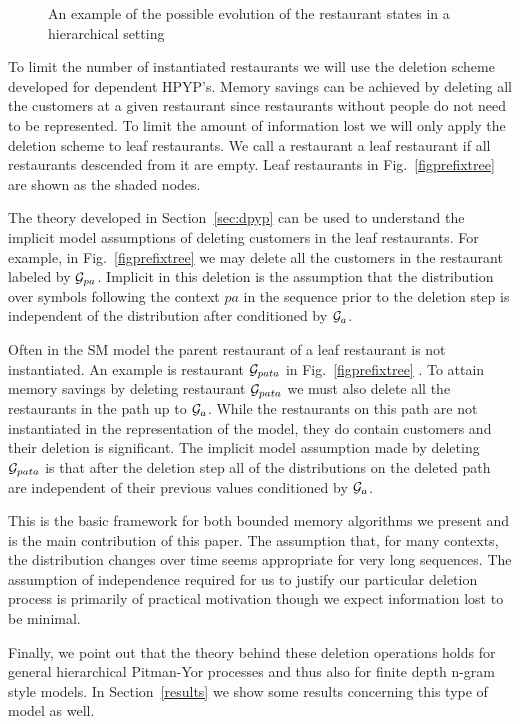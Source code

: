 \begin{figure}[t] 
	\begin{center}
		\caption{An example of the possible evolution of the restaurant states in a hierarchical setting}
		\label{figResultsCC}
	\end{center} 
\end{figure} 

To limit the number of instantiated restaurants we will use the deletion scheme developed for dependent HPYP's. Memory savings can be achieved by deleting all the customers at a given restaurant since restaurants without people do not need to be represented.  To limit the amount of information lost we will only apply the deletion scheme to leaf restaurants. We call a restaurant a leaf restaurant if all restaurants descended from it are empty. Leaf restaurants in Fig.~\ref{figprefixtree} are shown as the shaded nodes. 

The theory developed in Section~\ref{sec:dpyp} can be used to understand the implicit model assumptions of deleting customers in the leaf restaurants. For example, in Fig.~\ref{figprefixtree} we may delete all the customers in the restaurant labeled by $\G_{pa}$.  Implicit in this deletion is the assumption that the distribution over symbols following the context $pa$ in the sequence prior to the deletion step is independent of the distribution after conditioned by $\G_a$.

Often in the SM model the parent restaurant of a leaf restaurant is not instantiated.  An example is restaurant $\G_{pata}$ in Fig.~\ref{figprefixtree}  . To attain memory savings by deleting restaurant $\G_{pata}$ we must also delete all the restaurants in the path up to $\G_a$.  While the restaurants on this path are not instantiated in the representation of the model, they do contain customers and their deletion is significant.  The implicit model assumption made by deleting $\G_{pata}$ is that after the deletion step all of the distributions on the deleted path are independent of their previous values conditioned by $\G_a$.

This is the basic framework for both bounded memory algorithms we present and is the main contribution of this paper.  The assumption that, for many contexts, the distribution changes over time seems appropriate for very long sequences. The assumption of independence required for us to justify our particular deletion process is primarily of practical motivation though we expect information lost to be minimal. 

Finally, we point out that the theory behind these deletion operations holds for general hierarchical Pitman-Yor processes and thus also for finite depth n-gram style models.  In Section~\ref{results} we show some results concerning this type of model as well.

